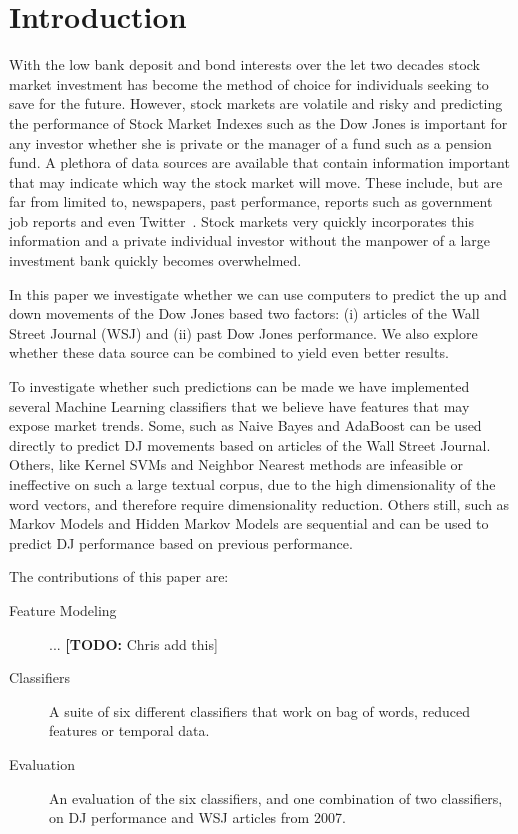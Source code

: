 \documentclass[10pt, twocolumn]{article}
\def\TODO#1{\noindent\textbf{[TODO:} #1]}
\begin{document}
\section{Introduction}

With the low bank deposit and bond interests over the let two decades stock market investment has become the method of choice for individuals seeking to save for the future.
However, stock markets are volatile and risky and predicting the performance of Stock Market Indexes such as the Dow Jones is important for any investor whether she is private or the manager of a fund such as a pension fund.
A plethora of data sources are available that contain information important that may indicate which way the stock market will move.
These include, but are far from limited to, newspapers, past performance, reports such as government job reports and even Twitter~\cite{twitter}.
Stock markets very quickly incorporates this information and a private individual investor without the manpower of a large investment bank quickly becomes overwhelmed.

In this paper we investigate whether we can use computers to predict the up and down movements of the Dow Jones based two factors: (i) articles of the Wall Street Journal (WSJ) and (ii) past Dow Jones performance.
We also explore whether these data source can be combined to yield even better results.

To investigate whether such predictions can be made we have implemented several Machine Learning classifiers that we believe have features that may expose market trends. Some, such as Naive Bayes and AdaBoost can be used directly to predict DJ movements based on articles of the Wall Street Journal. Others, like Kernel SVMs and Neighbor Nearest methods are infeasible or ineffective on such a large textual corpus, due to the high dimensionality of the word vectors, and therefore require dimensionality reduction.
Others still, such as Markov Models and Hidden Markov Models are sequential and can be used to predict DJ performance based on previous performance.

The contributions of this paper are:
\begin{description}
\item[Feature Modeling] ... \TODO{Chris add this}
\item[Classifiers] A suite of six different classifiers that work on bag of words, reduced features or temporal data.
\item[Evaluation] An evaluation of the six classifiers, and one combination of two classifiers, on DJ performance and WSJ articles from 2007.
\end{description}
\end{document}
